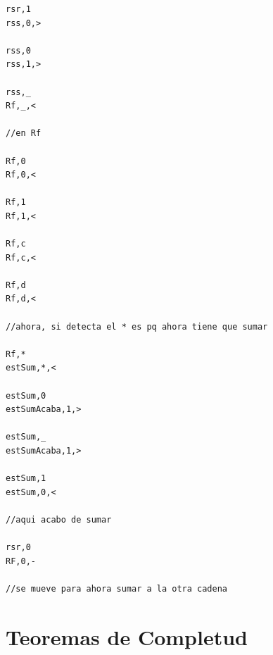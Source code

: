 \documentclass[12pt]{report}
\theoremstyle{largebreak}
\begin{document}
\begin{lstlisting}
rsr,1
rss,0,>

rss,0
rss,1,>

rss,_
Rf,_,<

//en Rf

Rf,0
Rf,0,<

Rf,1
Rf,1,<

Rf,c
Rf,c,<

Rf,d
Rf,d,<

//ahora, si detecta el * es pq ahora tiene que sumar

Rf,*
estSum,*,<

estSum,0
estSumAcaba,1,>

estSum,_
estSumAcaba,1,>

estSum,1
estSum,0,<

//aqui acabo de sumar

rsr,0
RF,0,-

//se mueve para ahora sumar a la otra cadena    
\end{lstlisting}

    \chapter{Teoremas de Completud}
\end{document}
